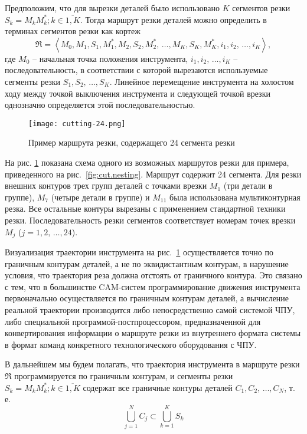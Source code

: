 Предположим, что для вырезки деталей было использовано
$K$
сегментов резки
$S_k=M_kM^*_k; k \in \overline{1,K}$.
Тогда маршрут резки деталей можно определить
в терминах сегментов резки как кортеж
\begin{equation}
  \mathfrak R = \left<
    M_0, M_1, S_1, M_1^*, M_2, S_2, M_2^*, \,\dots, M_K, S_K, M_K^*,
    i_1, i_2, \,\dots, i_K
  \right>
  ,
  \label{eq:cut.tuple}
\end{equation}
где
$M_0$
-- начальная точка положения инструмента,
$i_1, i_2, \,\dots, i_K$
– последовательность, в соответствии с которой вырезаются используемые сегменты резки
$S_1, S_2, \,\dots, S_K$.
Линейное перемещение инструмента на холостом ходу
между точкой выключения инструмента и следующей точкой врезки
однозначно определяется этой последовательностью.

\begin{figure}
  \centering
  \texttt{[image: cutting-24.png]}
  \caption{
    Пример маршрута резки,
    содержащего 24 сегмента резки
  }
  \label{fig:cut.cutting}
\end{figure}

На рис. \ref{fig:cut.cutting}
показана схема одного из возможных маршрутов резки для примера,
приведенного на рис.~\ref{fig:cut.nesting}.
Маршрут содержит 24 сегмента.
Для резки внешних контуров трех групп деталей
с точками врезки $M_1$
(три детали в группе),
$M_7$
(четыре детали в группе) и
$M_{11}$
была использована мультиконтурная резка.
Все остальные контуры вырезаны с применением стандартной техники резки.
Последовательность резки сегментов соответствует
номерам точек врезки $M_j$ ($j=1,2,\,\dots, 24$).

Визуализация траектории инструмента
на рис.~\ref{fig:cut.cutting}
осуществляется точно по граничным контурам деталей,
а не по эквидистантным контурам,
в нарушение условия, что
траектория реза должна отстоять от
граничного контура.
Это связано с тем, что в большинстве
CAM-систем
программирование движения инструмента первоначально
осуществляется по граничным контурам деталей,
а вычисление реальной траектории производится
либо непосредственно самой системой ЧПУ,
либо специальной программой-постпроцессором,
предназначенной для конвертирования информации о
маршруте резки из внутреннего формата системы в
формат команд конкретного технологического оборудования с ЧПУ.

В дальнейшем мы будем полагать,
что траектория инструмента в маршруте резки $\mathfrak R$
программируется по граничным контурам,
и сегменты резки
$S_k=M_kM^*_k; k \in \overline{1,K}$
содержат все граничные контуры деталей
$C_1, C_2, \,\dots, C_N$,
т. е.
$$
\bigcup_{j=1}^N C_j \subset \bigcup_{k=1}^K S_k
$$

